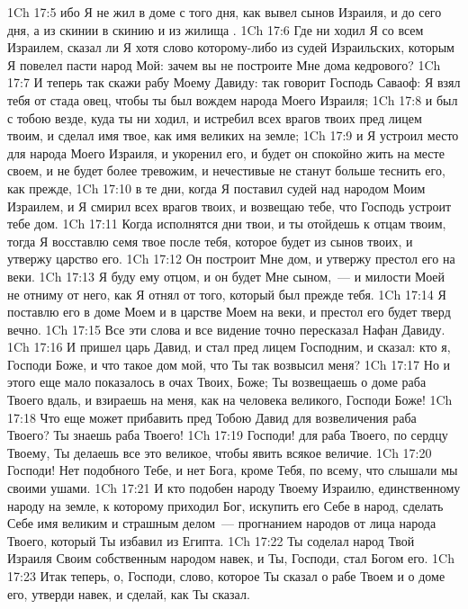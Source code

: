 \vs 1Ch 17:5 ибо Я не жил в доме с того дня, как вывел сынов Израиля, и до сего дня, а  из скинии в скинию и из жилища .
\vs 1Ch 17:6 Где ни ходил Я со всем Израилем, сказал ли Я хотя слово которому-либо из судей Израильских, которым Я повелел пасти народ Мой: зачем вы не построите Мне дома кедрового?
\vs 1Ch 17:7 И теперь так скажи рабу Моему Давиду: так говорит Господь Саваоф: Я взял тебя от стада овец, чтобы ты был вождем народа Моего Израиля;
\vs 1Ch 17:8 и был с тобою везде, куда ты ни ходил, и истребил всех врагов твоих пред лицем твоим, и сделал имя твое, как имя великих на земле;
\vs 1Ch 17:9 и Я устроил место для народа Моего Израиля, и укоренил его, и будет он спокойно жить на месте своем, и не будет более тревожим, и нечестивые не станут больше теснить его, как прежде,
\vs 1Ch 17:10 в те дни, когда Я поставил судей над народом Моим Израилем, и Я смирил всех врагов твоих, и возвещаю тебе, что Господь устроит тебе дом.
\vs 1Ch 17:11 Когда исполнятся дни твои, и ты отойдешь к отцам твоим, тогда Я восставлю семя твое после тебя, которое будет из сынов твоих, и утвержу царство его.
\vs 1Ch 17:12 Он построит Мне дом, и утвержу престол его на веки.
\vs 1Ch 17:13 Я буду ему отцом, и он будет Мне сыном,~--- и милости Моей не отниму от него, как Я отнял от того, который был прежде тебя.
\vs 1Ch 17:14 Я поставлю его в доме Моем и в царстве Моем на веки, и престол его будет тверд вечно.
\vs 1Ch 17:15 Все эти слова и все видение точно пересказал Нафан Давиду.
\rsbpar\vs 1Ch 17:16 И пришел царь Давид, и стал пред лицем Господним, и сказал: кто я, Господи Боже, и что такое дом мой, что Ты так возвысил меня?
\vs 1Ch 17:17 Но и этого еще мало показалось в очах Твоих, Боже; Ты возвещаешь о доме раба Твоего вдаль, и взираешь на меня, как на человека великого, Господи Боже!
\vs 1Ch 17:18 Что еще может прибавить пред Тобою Давид для возвеличения раба Твоего? Ты знаешь раба Твоего!
\vs 1Ch 17:19 Господи! для раба Твоего, по сердцу Твоему, Ты делаешь все это великое, чтобы явить всякое величие.
\vs 1Ch 17:20 Господи! Нет подобного Тебе, и нет Бога, кроме Тебя, по всему, что слышали мы своими ушами.
\vs 1Ch 17:21 И кто подобен народу Твоему Израилю, единственному народу на земле, к которому приходил Бог,  искупить его Себе в народ, сделать Себе имя великим и страшным делом~--- прогнанием народов от лица народа Твоего, который Ты избавил из Египта.
\vs 1Ch 17:22 Ты соделал народ Твой Израиля Своим собственным народом навек, и Ты, Господи, стал Богом его.
\vs 1Ch 17:23 Итак теперь, о, Господи, слово, которое Ты сказал о рабе Твоем и о доме его, утверди навек, и сделай, как Ты сказал.
